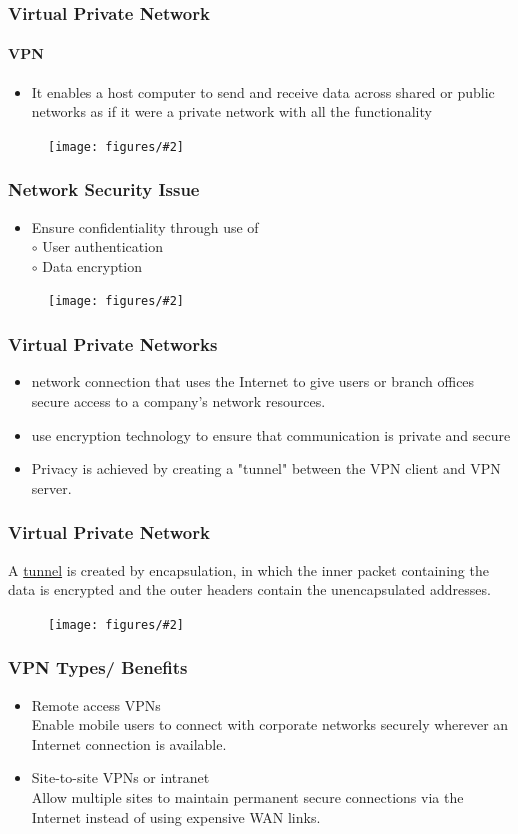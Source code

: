 \documentclass{beamer}
\newcommand{\fig}[2]{
\begin{center}
\begin{figure}
\texttt{[image: figures/\#2]}
\end{figure}
\end{center}
}
\begin{document}
\begin{frame}
\frametitle{\huge Virtual Private Network}
\framesubtitle{VPN}
\begin{itemize} 
\Large
\item <1-> It enables a host computer to send and receive data across shared or public networks as if it were a private network with all the functionality
\end{itemize}
\fig{0.3}{network_vpn}
\end{frame}


\begin{frame}
\frametitle{\huge Network Security Issue}
\begin{itemize} 
\Large
\item <1-> Ensure confidentiality through use of \\
\quad $\circ$ User authentication \\
\quad $\circ$ Data encryption
\end{itemize}
\fig{0.55}{network_security}
\end{frame}



\begin{frame}
\frametitle{\huge Virtual Private Networks}
\Large
\begin{itemize} 
\item <1-> network connection that uses the Internet to give users or branch offices secure access to a company's network resources.
\item <2-> use encryption technology to ensure that communication is private and secure
\item <3-> Privacy is achieved by creating a "tunnel" between the VPN client and VPN server.
\end{itemize}
\end{frame}


\begin{frame}
\frametitle{\huge Virtual Private Network}
A \underline{tunnel} is created by encapsulation, in which the inner packet containing the data is encrypted and the outer headers contain the unencapsulated addresses.
\fig{0.45}{network_tunnel}
\end{frame}


\begin{frame}
\frametitle{\huge VPN Types/ Benefits}
\Large
\begin{itemize} 
\item <1-> Remote access VPNs \\ Enable mobile users to connect with corporate networks securely wherever an Internet connection is available.
\item <2-> Site-to-site VPNs or intranet \\ Allow multiple sites to maintain permanent secure connections via the Internet instead of using expensive WAN links.
\end{itemize}
\end{frame}
\end{document}
